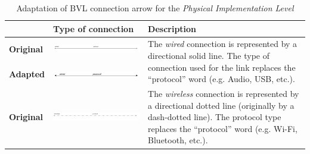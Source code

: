 \begin{longtable}{|m{}|m{}|m{}|}
    \caption{Adaptation of BVL connection arrow for the \textit{Physical Implementation Level}} \label{tab:c4-bvl_physical_arrow} \\
    \hline
    \textbf{} & \textbf{Type of connection} & \textbf{Description} \\
    \hline
    \centering
    \small \textbf{Original} \rule{0pt}{1.25cm} & 
    \centering
    \includegraphics[width=1\linewidth]{chapters/4-MDC_model_application/image/bvl-arrow-wired-o.png} &
    \multirow{2}{*}{\parbox[t]{\linewidth}{\vspace{-1cm}The \textit{wired} connection is represented by a directional solid line. The type of connection used for the link replaces the ``protocol'' word (e.g. Audio, USB, etc.).}}
    \\
    \centering
    \small \textbf{Adapted} \rule{0pt}{1.25cm} &
    \centering
    \includegraphics[width=1\linewidth]{chapters/4-MDC_model_application/image/bvl-arrow-wired.png} & 
    \\
    \hline
    \centering
    \small \textbf{Original} \rule{0pt}{1.43cm} & 
    \centering
    \includegraphics[width=1\linewidth]{chapters/4-MDC_model_application/image/bvl-arrow-wireless-o.png} &
    \multirow{2}{*}{\parbox[t]{\linewidth}{\vspace{-1.05cm}The \textit{wireless} connection is represented by a directional dotted line (originally by a dash-dotted line). The protocol type replaces the ``protocol'' word (e.g. Wi-Fi, Bluetooth, etc.).}}
    \\

\end{longtable}
